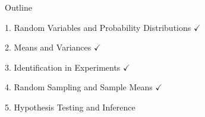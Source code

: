 \documentclass[11pt,english,handout]{beamer}
\begin{document}
%
%
%
%
%

\begin{frame}{Outline}
	
	\textcolor{red!75!green!50!blue!25!gray}{1. Random Variables and Probability Distributions} $\checkmark$
	\vspace{0.8cm}
	
	\textcolor{red!75!green!50!blue!25!gray}{2. Means and Variances} $\checkmark$
	\vspace{0.8cm}
	
	\textcolor{red!75!green!50!blue!25!gray}{3. Identification in Experiments} $\checkmark$
	\vspace{0.8cm}
	
	\textcolor{red!75!green!50!blue!25!gray}{4. Random Sampling and Sample Means} $\checkmark$
	
	\vspace{0.8cm}
	5. Hypothesis Testing and Inference 
	
\end{frame}
\end{document}
